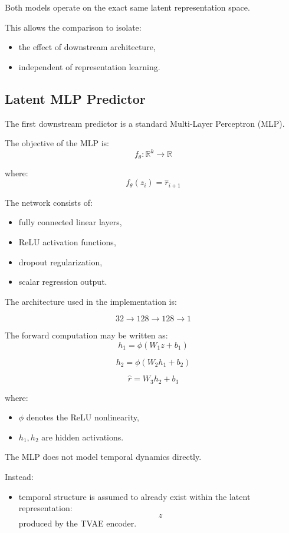 \documentclass[11pt]{article}
\begin{document}
Both models operate on the exact same latent representation space.

This allows the comparison to isolate:
\begin{itemize}
    \item the effect of downstream architecture,
    \item independent of representation learning.
\end{itemize}

\subsection{Latent MLP Predictor}

The first downstream predictor is a standard Multi-Layer Perceptron (MLP).

The objective of the MLP is:
\[
f_\theta :
\mathbb{R}^k
\rightarrow
\mathbb{R}
\]

where:
\[
f_\theta(z_i)
=
\hat r_{i+1}
\]

The network consists of:
\begin{itemize}
    \item fully connected linear layers,
    \item ReLU activation functions,
    \item dropout regularization,
    \item scalar regression output.
\end{itemize}

The architecture used in the implementation is:

\[
32
\rightarrow
128
\rightarrow
128
\rightarrow
1
\]

The forward computation may be written as:
\[
h_1
=
\phi(W_1 z + b_1)
\]

\[
h_2
=
\phi(W_2 h_1 + b_2)
\]

\[
\hat r
=
W_3 h_2 + b_3
\]

where:
\begin{itemize}
    \item \(\phi\) denotes the ReLU nonlinearity,
    \item \(h_1,h_2\) are hidden activations.
\end{itemize}

The MLP does not model temporal dynamics directly.

Instead:
\begin{itemize}
    \item temporal structure is assumed to already exist within the latent representation:
    \[
    z
    \]
    produced by the TVAE encoder.
\end{itemize}
\end{document}
